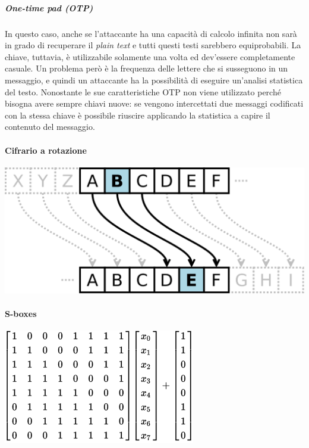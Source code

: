 \subparagraph*{One-time pad (OTP)}
In questo caso, anche se l'attaccante ha una capacità di calcolo infinita non
sarà in grado di recuperare il \textit{plain text} e tutti questi testi
sarebbero equiprobabili.
La chiave, tuttavia, è utilizzabile solamente una volta ed dev'essere
completamente casuale.
Un problema però è la frequenza delle lettere che si susseguono in un messaggio,
e quindi un attaccante ha la possibilità di eseguire un'analisi statistica del
testo.
Nonostante le sue caratteristiche OTP non viene utilizzato perché bisogna avere
sempre chiavi nuove: se vengono intercettati due messaggi codificati con la
stessa chiave è possibile riuscire applicando la statistica a capire il
contenuto del messaggio.

\paragraph{Cifrario a rotazione}

\begin{center}
  \includegraphics[scale=0.2]{res/img/caesar.png}
  \label{fig:password:caesar}
\end{center}


\paragraph{S-boxes}

\begin{center}
  \includegraphics[scale=0.5]{res/img/sboxes.png}
  \label{fig:password:sboxes}
\end{center}


